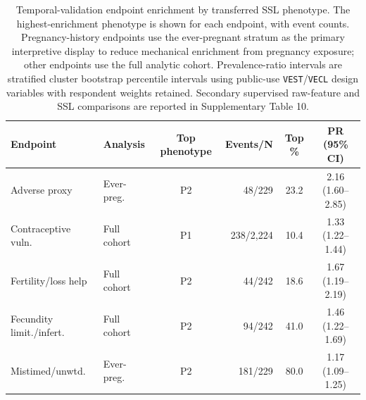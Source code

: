 \begin{table}[tbp]
\centering
\caption{Temporal-validation endpoint enrichment by transferred SSL phenotype. The highest-enrichment phenotype is shown for each endpoint, with event counts. Pregnancy-history endpoints use the ever-pregnant stratum as the primary interpretive display to reduce mechanical enrichment from pregnancy exposure; other endpoints use the full analytic cohort. Prevalence-ratio intervals are stratified cluster bootstrap percentile intervals using public-use \texttt{VEST}/\texttt{VECL} design variables with respondent weights retained. Secondary supervised raw-feature and SSL comparisons are reported in Supplementary Table 10.}
\label{tab:enrichment}
\scriptsize
\setlength{\tabcolsep}{2pt}
\begin{tabular*}{\textwidth}{@{\extracolsep{\fill}}>{\raggedright\arraybackslash}p{}lcrcc@{}}
\toprule
Endpoint & Analysis & Top phenotype & Events/N & Top \% & PR (95\% CI) \\
\midrule
Adverse proxy & Ever-preg. & P2 & 48/229 & 23.2 & 2.16 (1.60--2.85) \\
Contraceptive vuln. & Full cohort & P1 & 238/2,224 & 10.4 & 1.33 (1.22--1.44) \\
Fertility/loss help & Full cohort & P2 & 44/242 & 18.6 & 1.67 (1.19--2.19) \\
Fecundity limit./infert. & Full cohort & P2 & 94/242 & 41.0 & 1.46 (1.22--1.69) \\
Mistimed/unwtd. & Ever-preg. & P2 & 181/229 & 80.0 & 1.17 (1.09--1.25) \\
\bottomrule
\end{tabular*}
\end{table}
